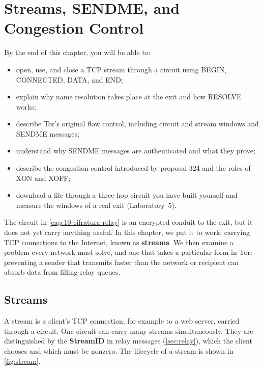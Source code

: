 \chapter{Streams, SENDME, and Congestion Control}\label{cap:11-stream}

\begin{obiettivi}
By the end of this chapter, you will be able to:
\begin{itemize}[nosep]
  \item open, use, and close a TCP stream through a circuit using BEGIN, CONNECTED, DATA, and END;
  \item explain why name resolution takes place at the exit and how RESOLVE works;
  \item describe Tor's original flow control, including circuit and stream windows and SENDME messages;
  \item understand why SENDME messages are authenticated and what they prove;
  \item describe the congestion control introduced by proposal 324 and the roles of XON and XOFF;
  \item download a file through a three-hop circuit you have built yourself and measure the windows of a real exit (Laboratory~5).
\end{itemize}
\end{obiettivi}

The circuit in \cref{cap:10-cifratura-relay} is an encrypted conduit to the exit, but it does not yet carry anything useful. In this chapter, we put it to work: carrying TCP connections to the Internet, known as \textbf{streams}. We then examine a problem every network must solve, and one that takes a particular form in Tor: preventing a sender that transmits faster than the network or recipient can absorb data from filling relay queues.

\section{Streams}\label{sec:stream}

A stream is a client's TCP connection, for example to a web server, carried through a circuit. One circuit can carry many streams simultaneously. They are distinguished by the \textbf{StreamID} in relay messages (\cref{sec:relay}), which the client chooses and which must be nonzero. The lifecycle of a stream is shown in \cref{fig:stream}.

